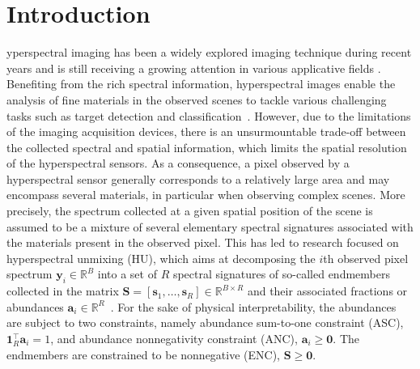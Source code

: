 \documentclass[journal,a4paper]{IEEEtran}
\newcommand{\bn}{\boldsymbol{n}}
\newcommand{\bfY}{\mathbf{Y}}
\newcommand{\bfy}{\mathbf{y}}
\newcommand{\bfa}{\mathbf{a}}
\newcommand{\MATend}{\mathbf{S}}
\begin{document}
\section{Introduction}
\label{sec:intro} yperspectral imaging has been a widely explored imaging technique during recent years and is still receiving a growing attention in various applicative fields \cite{Dobigeon_IEEE_JSTARS_2014,yuen2010introduction}. Benefiting from the rich spectral information, hyperspectral images enable the analysis of fine materials in the observed scenes to tackle various challenging tasks such as target detection and classification~\cite{duan2021semisupervised,luo2020dimensionality}. However, due to the limitations of the imaging acquisition devices, there is an unsurmountable trade-off between the collected spectral and spatial information, which limits the spatial resolution of the hyperspectral sensors. As a consequence, a pixel observed by a hyperspectral sensor generally corresponds to a relatively large area and may encompass several materials, in particular when observing complex scenes. More precisely, the spectrum collected at a given spatial position of the scene is assumed to be a mixture of several elementary spectral signatures associated with the materials present in the observed pixel. This has led to research focused on hyperspectral unmixing (HU), which aims at decomposing the $i$th observed pixel spectrum $\bfy_i \in \mathbb{R}^B$ into a set of $R$ spectral signatures of so-called endmembers collected in the matrix $\MATend=\left[\mathbf{s}_1,\ldots,\mathbf{s}_R\right] \in \mathbb{R}^{B\times R}$ and their associated fractions or abundances $\bfa_i \in \mathbb{R}^{R}$~\cite{bioucas2013hyperspectral,dobigeon2013nonlinear,borsoi2021spectral}. 
For the sake of physical interpretability, the abundances are subject to two constraints, namely abundance sum-to-one constraint (ASC), $\boldsymbol{1}_{R}^{\top}\bfa_i=1$, and abundance nonnegativity constraint (ANC), $\bfa_i\geq \boldsymbol{0}$. The endmembers are constrained to be nonnegative (ENC), $\MATend\geq \boldsymbol{0}$.
\end{document}
